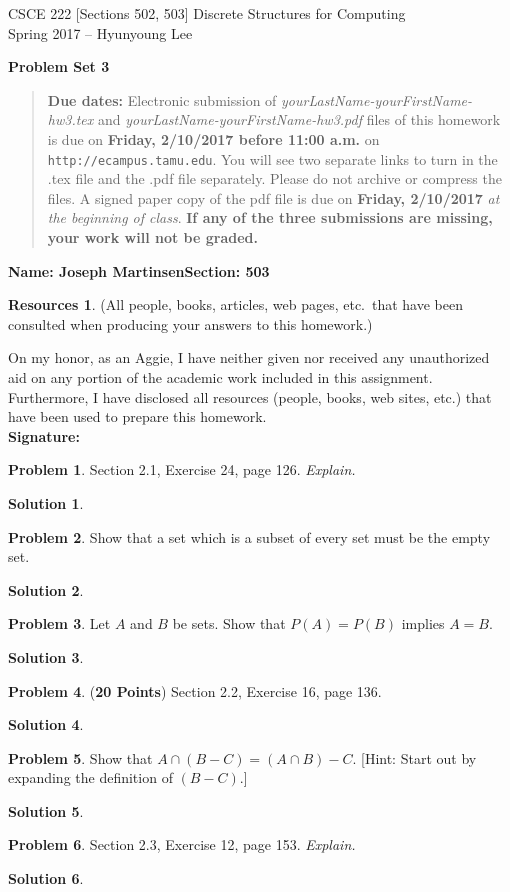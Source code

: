 \documentclass{article}
\theoremstyle{definition}
\newtheorem{problem}{Problem}
\newtheorem*{solution}{Solution}
\newtheorem*{resources}{Resources}
\newcommand{\name}[2]{\noindent\textbf{Name: #1}\hfill \textbf{Section: #2}}
\newcommand{\honor}{\noindent On my honor, as an Aggie, I have neither
  given nor received any unauthorized aid on any portion of the
  academic work included in this assignment. Furthermore, I have
  disclosed all resources (people, books, web sites, etc.) that have
  been used to prepare this homework. \\[2ex]
 \textbf{Signature:} \underline{\hspace*{10cm}} }
\newcommand{\problemset}[1]{\begin{center}\textbf{Problem Set #1}\end{center}}
\newcommand{\duedate}[2]{\begin{quote}\textbf{Due dates:} Electronic
    submission of \textsl{yourLastName-yourFirstName-hw3.tex} and 
    \textsl{yourLastName-yourFirstName-hw3.pdf} files of this homework is due on
    \textbf{#1} on \texttt{http://ecampus.tamu.edu}. You will see two separate links
    to turn in the .tex file and the .pdf file separately. Please do not archive or compress the files.  
    A signed paper copy of the pdf file is due on \textbf{#2} \textsl{at the beginning of class}.
    \textbf{If any of the three submissions are missing, your work will not be graded.}\end{quote} }
\begin{document}
\vspace*{-15mm}
\begin{center}
{\large
CSCE 222 [Sections 502, 503] Discrete Structures for Computing\\[.5ex]
Spring 2017 -- Hyunyoung Lee\\}
\end{center}
\problemset{3}
\duedate{Friday, 2/10/2017 before 11:00 a.m.}{Friday, 2/10/2017}
\name{Joseph Martinsen}{503}
\begin{resources} (All people, books, articles, web pages, etc.\ that
  have been consulted when producing your answers to this homework.)
\end{resources}
\honor

\smallskip

\begin{problem} Section 2.1, Exercise 24, page 126. \textsl{Explain.}
\end{problem}
\begin{solution}
\end{solution}

\begin{problem} Show that a set which is a subset of every set must be the empty set.
\end{problem}
\begin{solution}
\end{solution}

\begin{problem} Let $A$ and $B$ be sets. Show that $P(A)=P(B)$ implies $A=B$.
\end{problem}
\begin{solution}
\end{solution}

\begin{problem} (\textbf{20 Points}) Section 2.2, Exercise 16, page 136.
\end{problem}
\begin{solution}
\end{solution}

\begin{problem} Show that $A\cap (B - C) = (A\cap B) - C$.
[Hint: Start out by expanding the definition of $(B - C)$.]
\end{problem}
\begin{solution}
\end{solution}

\begin{problem} Section 2.3, Exercise 12, page 153. \textsl{Explain.} 
\end{problem}
\begin{solution}
\end{solution}
\end{document}
